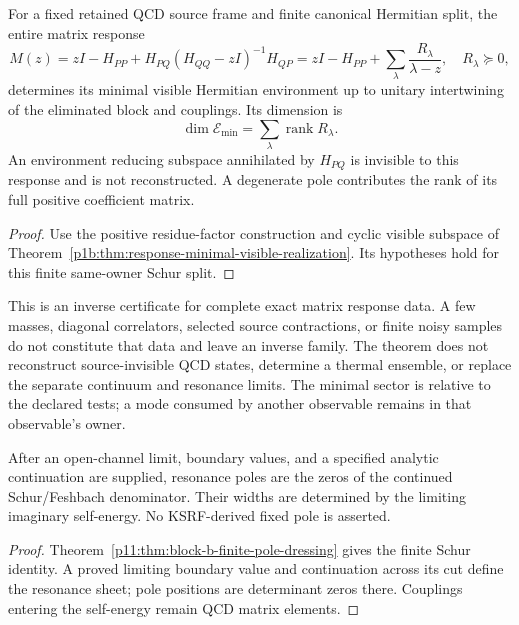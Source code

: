 \documentclass[12pt,a4paper]{article}
\begin{document}
\begin{theorem}
\label{p11:thm:response-visible-inverse}
For a fixed retained QCD source frame and finite canonical Hermitian
split, the entire matrix response
\[
 M(z)=zI-H_{PP}
       +H_{PQ}(H_{QQ}-zI)^{-1}H_{QP}
     =zI-H_{PP}+\sum_\lambda\frac{R_\lambda}{\lambda-z},
 \quad R_\lambda\succeq0,
\]
determines its minimal visible Hermitian environment up to unitary
intertwining of the eliminated block and couplings.  Its dimension is
\[
 \boxed{\dim\mathcal E_{\min}
          =\sum_\lambda\operatorname{rank}R_\lambda.}
\]
An environment reducing subspace annihilated by $H_{PQ}$ is invisible to
this response and is not reconstructed.  A degenerate pole contributes
the rank of its full positive coefficient matrix.
\end{theorem}
\begin{proof}
Use the positive residue-factor construction and cyclic visible subspace
of Theorem~\ref{p1b:thm:response-minimal-visible-realization}.
Its hypotheses hold for this finite same-owner Schur split.
\end{proof}
This is an inverse certificate for complete exact matrix response data.
A few masses, diagonal correlators, selected source contractions, or
finite noisy samples do not constitute that data and leave an inverse
family.  The theorem does not reconstruct source-invisible QCD states,
determine a thermal ensemble, or replace the separate continuum and
resonance limits.  The minimal sector is relative to the declared tests;
a mode consumed by another observable remains in that observable's
owner.

\begin{corollary}
\label{p11:cor:block-b-leading-vector-complex-poles}

After an open-channel limit, boundary values, and a specified analytic
continuation are supplied, resonance poles are the zeros of the continued
Schur/Feshbach denominator.  Their widths are determined by the limiting
imaginary self-energy.  No KSRF-derived fixed pole is asserted.
\label{p11:eq:block-b-vector-complex-poles}
\end{corollary}
\begin{proof}

Theorem~\ref{p11:thm:block-b-finite-pole-dressing} gives the finite Schur
identity.  A proved limiting boundary value and continuation across its cut
define the resonance sheet; pole positions are determinant zeros there.
Couplings entering the self-energy remain QCD matrix elements.
\end{proof}
\end{document}
